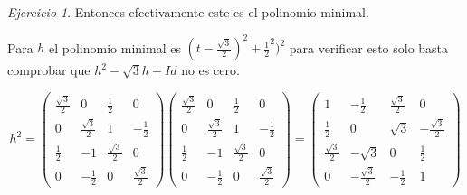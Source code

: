 \documentclass[11pt,a4paper]{article}
\theoremstyle{definition}
\theoremstyle{remark}
\newtheorem{exc}{Ejercicio}
\begin{document}
\begin{exc}
			Entonces efectivamente este es el polinomio minimal.
			
			Para $ h $ el polinomio minimal es $ (t-\frac{\sqrt{3}}{2})^2+\frac{1}{2}^2)^2 $ para verificar esto solo basta comprobar que $ h^2-\sqrt{3}h+Id $ no es cero.
			
			\begin{equation}
			h^2 =
			\begin{pmatrix}
	    	\frac{\sqrt{3}}{2} & 0 & \frac{1}{2} & 0
	    	\\ 0 & \frac{\sqrt{3}}{2} & 1 & -\frac{1}{2} 
	    	\\ \frac{1}{2} & -1 & \frac{\sqrt{3}}{2} & 0
	    	\\ 0 & -\frac{1}{2} & 0 & \frac{\sqrt{3}}{2}
	    	\end{pmatrix} 
	    	\begin{pmatrix}
   	    	\frac{\sqrt{3}}{2} & 0 & \frac{1}{2} & 0
   	    	\\ 0 & \frac{\sqrt{3}}{2} & 1 & -\frac{1}{2} 
   	    	\\ \frac{1}{2} & -1 & \frac{\sqrt{3}}{2} & 0
   	    	\\ 0 & -\frac{1}{2} & 0 & \frac{\sqrt{3}}{2}
   	    	\end{pmatrix}
   	    	=\begin{pmatrix}
   	    	1 & -\frac{1}{2} & \frac{\sqrt{3}}{2} & 0
   	    	\\ \frac{1}{2} & 0 & \sqrt{3} & -\frac{\sqrt{3}}{2} 
   	    	\\ \frac{\sqrt{3}}{2} & -\sqrt{3} & 0 & \frac{1}{2}
   	    	\\ 0 & -\frac{\sqrt{3}}{2} & -\frac{1}{2} & 1
   	    	\end{pmatrix}\nonumber
			\end{equation}
			

\end{exc}
\end{document}
